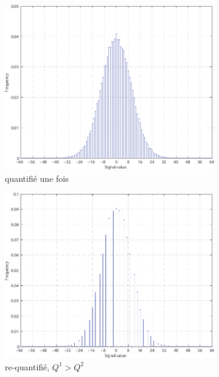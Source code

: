 \documentclass[utf8]{stageM2R} %
\begin{document}
\begin{figure}
  \begin{subfigure}{.33\textwidth}
    \centering
    \includegraphics[width=\linewidth]{images/h1}
    \caption{quantifié une fois}
    \label{ha}
  \end{subfigure}
  \begin{subfigure}{.33\textwidth}
    \centering
    \includegraphics[width=\linewidth]{images/h2}
    \caption{re-quantifié, $Q^{1} > Q^{2}$}
    \label{hb}
  \end{subfigure}
  \begin{subfigure}{.33\textwidth}
    \centering

\end{subfigure}
\end{figure}
\end{document}
